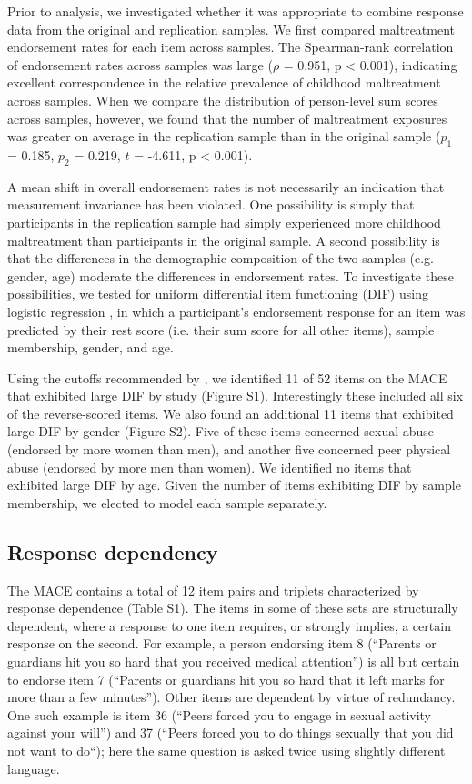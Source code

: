 \documentclass[letterpaper,man,natbib]{apa6}  %
\begin{document}
Prior to analysis, we investigated whether it was appropriate to combine response data from the original and replication samples. We first compared maltreatment endorsement rates for each item across samples. The Spearman-rank correlation of endorsement rates across samples was large ($\rho$ = 0.951, p < 0.001), indicating excellent correspondence in the relative prevalence of childhood maltreatment across samples. When we compare the distribution of person-level sum scores across samples,  however, we found that the number of maltreatment exposures was greater on average in the replication sample than in the original sample ($p_1$ = 0.185, $p_2$ = 0.219, $t$ = -4.611, p < 0.001). 

A mean shift in overall endorsement rates is not necessarily an indication that measurement invariance has been violated. One possibility is simply that participants in the replication sample had simply experienced more childhood maltreatment than participants in the original sample. A second possibility is that the differences in the demographic composition of the two samples (e.g. gender, age) moderate the differences in endorsement rates. To investigate these possibilities, we tested for uniform differential item functioning (DIF) using logistic regression \citep{rogers1993comparison}, in which a participant's endorsement response for an item was predicted by their rest score (i.e. their sum score for all other items), sample membership, gender, and age. 

Using the cutoffs recommended by \cite{hidalgo2014binary}, we identified 11 of 52 items on the MACE that exhibited large DIF by study (Figure S1). Interestingly these included all six of the reverse-scored items. We also found an additional 11 items that exhibited large DIF by gender (Figure S2). Five of these items concerned sexual abuse (endorsed by more women than men), and another five concerned peer physical abuse (endorsed by more men than women). We identified no items that exhibited large DIF by age. Given the number of items exhibiting DIF by sample membership, we elected to model each sample separately.

\subsection{Response dependency}

The MACE contains a total of 12 item pairs and triplets characterized by response dependence (Table S1). The items in some of these sets are structurally dependent, where a response to one item requires, or strongly implies, a certain response on the second. For example, a person endorsing item 8 (``Parents or guardians hit you so hard that you received medical attention'') is all but certain to endorse item 7 (``Parents or guardians hit you so hard that it left marks for more than a few minutes''). Other items are dependent by virtue of redundancy. One such example is item 36 (``Peers forced you to engage in sexual activity against your will'') and 37 (``Peers forced you to do things sexually that you did not want to do``); here the same question is asked twice using slightly different language.
\end{document}
